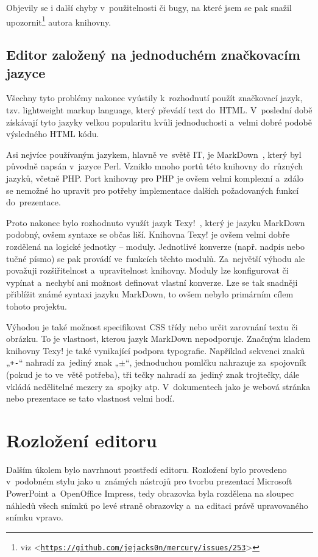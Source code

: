 \documentclass[11pt,twoside,a4paper]{book}
\let\oldUrl\url									%
\renewcommand\url[1]{<\texttt{\oldUrl{#1}}>}
\begin{document}
Objevily se i další chyby v~použitelnosti či bugy, na které jsem se pak snažil upozornit\footnote{viz \url{https://github.com/jejacks0n/mercury/issues/253}} autora knihovny.

\subsection{Editor založený na jednoduchém značkovacím jazyce}
Všechny tyto problémy nakonec vyústily k~rozhodnutí použít značkovací jazyk, tzv. light\-weight markup language, který
převádí text do~HTML. V~poslední době získávají tyto jazyky velkou popularitu kvůli jednoduchosti a~velmi dobré podobě
výsledného HTML kódu.

Asi nejvíce používaným jazykem, hlavně ve~světě IT, je Mark\-Down~\cite{markdown}, který byl původně napsán v~jazyce Perl. Vzniklo mnoho portů této knihovny do~různých jazyků, včetně PHP. Port knihovny pro PHP je ovšem velmi komplexní a~zdálo se nemožné ho upravit pro potřeby imple\-mentace dalších požadovaných funkcí do~prezentace.

Proto nakonec bylo rozhodnuto využít jazyk Texy!~\cite{texy}, který je jazyku Mark\-Down podobný, ovšem syntaxe se občas liší. Knihovna Texy! je ovšem velmi dobře rozdělená na logické jednotky – moduly. Jednotlivé konverze (např. nadpis nebo tučné písmo) se pak provádí ve~funkcích těchto modulů. Za~největší výhodu ale považuji rozšiřitelnost a~upravitelnost knihovny. Moduly lze konfigurovat či vypínat a~nechybí ani možnost definovat vlastní konverze. Lze se tak snadněji přiblížit známé syntaxi jazyku Mark\-Down, to ovšem nebylo primárním cílem tohoto projektu.

Výhodou je také možnost specifikovat CSS třídy nebo určit zarovnání textu či obrázku. To je vlastnost, kterou jazyk Mark\-Down nepodporuje. Značným kladem knihovny Texy! je také vynikající podpora typografie. Například sekvenci znaků „\lstinline|+-|“ nahradí za~jediný znak „$\pm$“, jednoduchou pomlčku nahrazuje za~spojovník (pokud je to ve~větě potřeba), tři tečky nahradí za~jediný znak trojtečky, dále vkládá nedělitelné mezery za~spojky atp. V~dokumentech jako je webová stránka nebo prezentace se tato vlastnost velmi hodí.


\section{Rozložení editoru}
Dalším úkolem bylo navrhnout prostředí editoru. Rozložení bylo provedeno v~podobném stylu jako u~známých nástrojů pro tvorbu prezentací Microsoft PowerPoint a~OpenOffice Impress, tedy obrazovka byla rozdělena na sloupec náhledů všech snímků po levé straně obrazovky a~na editaci právě upravovaného snímku vpravo.
\end{document}
